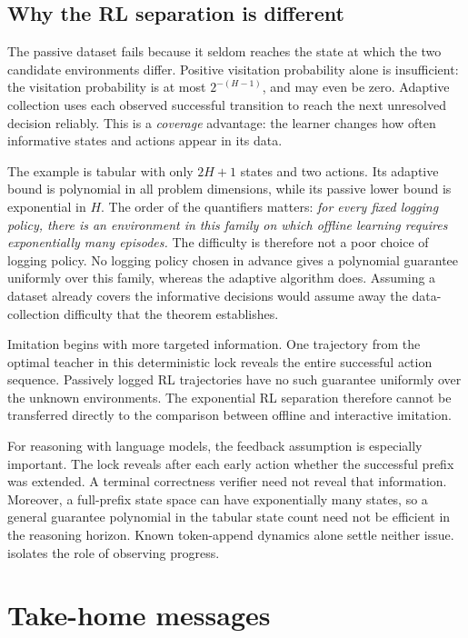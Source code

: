 \documentclass[11pt,twoside]{article}
\theoremstyle{definition}
\theoremstyle{remark}
\begin{document}
\subsection{Why the RL separation is different}

The passive dataset fails because it seldom reaches the state at which
the two candidate environments differ. Positive visitation probability
alone is insufficient: the visitation probability is at most
$2^{-(H-1)}$, and may even be zero.
Adaptive collection uses each observed successful transition to reach the
next unresolved decision reliably. This is a \emph{coverage} advantage:
the learner changes how often informative states and actions appear in its
data.

The example is tabular with only $2H+1$ states and two actions. Its adaptive
bound is polynomial in all problem dimensions, while its passive lower
bound is exponential in $H$. The order of the quantifiers matters:
\emph{for every fixed logging policy, there is an environment in this family
on which offline learning requires exponentially many episodes.}
The difficulty is therefore not a poor choice of logging policy.
No logging policy chosen in advance gives a polynomial guarantee uniformly
over this family, whereas the adaptive algorithm does. Assuming a dataset
already covers the informative decisions would assume away the
data-collection difficulty that the theorem establishes.

Imitation begins with more targeted information. One trajectory from the
optimal teacher in this deterministic lock reveals the entire successful
action sequence. Passively logged RL trajectories have no such guarantee
uniformly over the unknown environments.
The exponential RL separation therefore cannot be transferred directly to
the comparison between offline and interactive imitation.

For reasoning with language models, the feedback assumption is especially
important. The lock reveals after each early action whether the successful
prefix was extended. A terminal correctness verifier need not reveal that
information. Moreover, a full-prefix state space can have exponentially many
states, so a general guarantee polynomial in the tabular state count need
not be efficient in the reasoning horizon. Known token-append dynamics
alone settle neither issue.  isolates the
role of observing progress.

\section{Take-home messages}
\label{sec:take-home}
\end{document}
